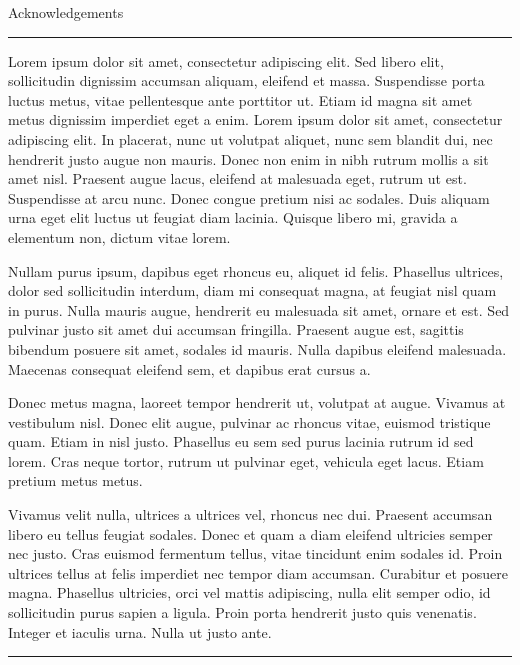 \begin{vcenterpage}
{\LARGE{\sc Acknowledgements}}

\noindent\rule[2pt]{\textwidth}{0.5pt}

Lorem ipsum dolor sit amet, consectetur adipiscing elit. Sed libero elit, sollicitudin dignissim accumsan aliquam, eleifend et massa. Suspendisse porta luctus metus, vitae pellentesque ante porttitor ut. Etiam id magna sit amet metus dignissim imperdiet eget a enim. Lorem ipsum dolor sit amet, consectetur adipiscing elit. In placerat, nunc ut volutpat aliquet, nunc sem blandit dui, nec hendrerit justo augue non mauris. Donec non enim in nibh rutrum mollis a sit amet nisl. Praesent augue lacus, eleifend at malesuada eget, rutrum ut est. Suspendisse at arcu nunc. Donec congue pretium nisi ac sodales. Duis aliquam urna eget elit luctus ut feugiat diam lacinia. Quisque libero mi, gravida a elementum non, dictum vitae lorem.

Nullam purus ipsum, dapibus eget rhoncus eu, aliquet id felis. Phasellus ultrices, dolor sed sollicitudin interdum, diam mi consequat magna, at feugiat nisl quam in purus. Nulla mauris augue, hendrerit eu malesuada sit amet, ornare et est. Sed pulvinar justo sit amet dui accumsan fringilla. Praesent augue est, sagittis bibendum posuere sit amet, sodales id mauris. Nulla dapibus eleifend malesuada. Maecenas consequat eleifend sem, et dapibus erat cursus a.

Donec metus magna, laoreet tempor hendrerit ut, volutpat at augue. Vivamus at vestibulum nisl. Donec elit augue, pulvinar ac rhoncus vitae, euismod tristique quam. Etiam in nisl justo. Phasellus eu sem sed purus lacinia rutrum id sed lorem. Cras neque tortor, rutrum ut pulvinar eget, vehicula eget lacus. Etiam pretium metus metus.

Vivamus velit nulla, ultrices a ultrices vel, rhoncus nec dui. Praesent accumsan libero eu tellus feugiat sodales. Donec et quam a diam eleifend ultricies semper nec justo. Cras euismod fermentum tellus, vitae tincidunt enim sodales id. Proin ultrices tellus at felis imperdiet nec tempor diam accumsan. Curabitur et posuere magna. Phasellus ultricies, orci vel mattis adipiscing, nulla elit semper odio, id sollicitudin purus sapien a ligula. Proin porta hendrerit justo quis venenatis. Integer et iaculis urna. Nulla ut justo ante.

\noindent\rule[2pt]{\textwidth}{0.5pt}
\end{vcenterpage}
